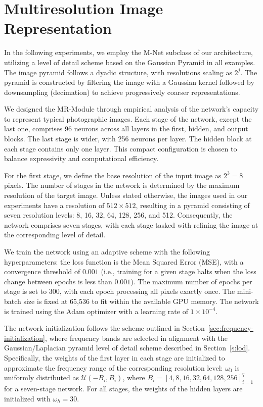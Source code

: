 \section{Multiresolution Image Representation}
\label{s:img}


In the following experiments, we employ the M-Net subclass of our architecture, utilizing a level of detail scheme based on the Gaussian Pyramid in all examples. The image pyramid follows a dyadic structure, with resolutions scaling as \( 2^j \). The pyramid is constructed by filtering the image with a Gaussian kernel followed by downsampling (decimation) to achieve progressively coarser representations.

We designed the MR-Module through empirical analysis of the network's capacity to represent typical photographic images. Each stage of the network, except the last one, comprises 96 neurons across all layers in the first, hidden, and output blocks. The last stage is wider, with 256 neurons per layer. The hidden block at each stage contains only one layer. This compact configuration is chosen to balance expressivity and computational efficiency.

For the first stage, we define the base resolution of the input image as \( 2^3 = 8 \) pixels. The number of stages in the network is determined by the maximum resolution of the target image. Unless stated otherwise, the images used in our experiments have a resolution of \(512 \times 512\), resulting in a pyramid consisting of seven resolution levels: 8, 16, 32, 64, 128, 256, and 512. Consequently, the network comprises seven stages, with each stage tasked with refining the image at the corresponding level of detail.

We train the network using an adaptive scheme with the following hyperparameters: the loss function is the Mean Squared Error (MSE), with a convergence threshold of \(0.001\) (i.e., training for a given stage halts when the loss change between epochs is less than \(0.001\)). The maximum number of epochs per stage is set to 300, with each epoch processing all pixels exactly once. The mini-batch size is fixed at 65,536 to fit within the available GPU memory. The network is trained using the Adam optimizer with a learning rate of \(1 \times 10^{-4}\).

The network initialization follows the scheme outlined in Section~\ref{sec:frequency-initialization}, where frequency bands are selected in alignment with the Gaussian/Laplacian pyramid level of detail scheme described in Section~\ref{s:lod}. Specifically, the weights of the first layer in each stage are initialized to approximate the frequency range of the corresponding resolution level: \(\omega_0\) is uniformly distributed as \( \mathcal{U}(-B_i, B_i)\), where \( B_i = [4, 8, 16, 32, 64, 128, 256]_{i=1}^7 \) for a seven-stage network. For all stages, the weights of the hidden layers are initialized with \(\omega_h = 30\).


